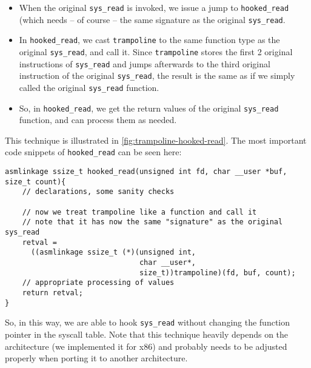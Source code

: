 \documentclass[10pt, letterpaper]{article}
\begin{document}
\begin{itemize}
\item When the original \texttt{sys\_read} is invoked, we issue a jump to \texttt{hooked\_read} (which needs -- of course -- the same signature as the original \texttt{sys\_read}.
\item In \texttt{hooked\_read}, we cast \texttt{trampoline} to the same function type as the original \texttt{sys\_read}, and call it. Since \texttt{trampoline} stores the first 2 original instructions of \texttt{sys\_read} and jumps afterwards to the third original instruction of the original \texttt{sys\_read}, the result is the same as if we simply called the original \texttt{sys\_read} function.
\item So, in \texttt{hooked\_read}, we get the return values of the original \texttt{sys\_read} function, and can process them as needed.
\end{itemize}

This technique is illustrated in \autoref{fig:trampoline-hooked-read}. The most important code snippets of \texttt{hooked\_read} can be seen here:

\begin{verbatim}
asmlinkage ssize_t hooked_read(unsigned int fd, char __user *buf, size_t count){
    // declarations, some sanity checks

    // now we treat trampoline like a function and call it
    // note that it has now the same "signature" as the original sys_read
    retval = 
      ((asmlinkage ssize_t (*)(unsigned int, 
                               char __user*,
                               size_t))trampoline)(fd, buf, count);
    // appropriate processing of values
    return retval;
}
\end{verbatim}

So, in this way, we are able to hook \texttt{sys\_read} without changing the function pointer in the syscall table. Note that this technique heavily depends on the architecture (we implemented it for x86) and probably needs to be adjusted properly when porting it to another architecture.
\end{document}
